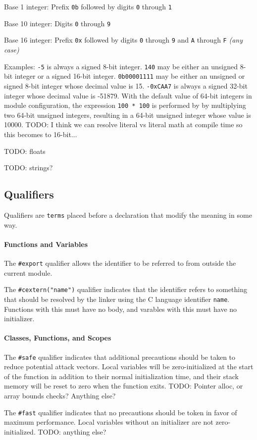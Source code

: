 \documentclass{article}
\newcommand{\code}[1]{\colorbox{light-gray}{\texttt{#1}}}
\newcommand{\breakingparagraph}[1]{\paragraph{#1}\mbox{}\medbreak}
\begin{document}
Base 1 integer: Prefix \code{0b} followed by digits \code{0} through \code{1}

Base 10 integer: Digits \code{0} through \code{9}

Base 16 integer: Prefix \code{0x} followed by digits \code{0} through \code{9} and \code{A} through \code {F} \textit{(any case)}

Examples: \code{-5} is always a signed 8-bit integer.  \code{140} may be either an unsigned 8-bit integer or a signed 16-bit integer.  \code{0b00001111} may be either an unsigned or signed 8-bit integer whose decimal value is 15.  \code{-0xCAA7} is always a signed 32-bit integer whose decimal value is -51879.  With the default value of 64-bit integers in module configuration, the expression \code{100 * 100} is performed by by multiplying two 64-bit unsigned integers, resulting in a 64-bit unsigned integer whose value is 10000.  TODO: I think we can resolve literal vs literal math at compile time so this becomes to 16-bit...

TODO: floats

TODO: strings?

\subsection{Qualifiers}

Qualifiers are \code{terms} placed before a declaration that modify the meaning in some way.

\breakingparagraph{Functions and Variables}

The \code{\#export} qualifier allows the identifier to be referred to from outside the current module.

The \code{\#cextern("name")} qualifier indicates that the identifier refers to something that should be resolved by the linker using the C language identifier \code{name}.  Functions with this must have no body, and varables with this must have no initializer.

\breakingparagraph{Classes, Functions, and Scopes}

The \code{\#safe} qualifier indicates that additional precautions should be taken to reduce potential attack vectors.  Local variables will be zero-initialized at the start of the function in addition to their normal initialization time, and their stack memory will be reset to zero when the function exits.  TODO: Pointer alloc, or array bounds checks? Anything else?

The \code{\#fast} qualifier indicates that no precautions should be token in favor of maximum performance.  Local variables without an initializer are not zero-initialized.  TODO: anything else?
\end{document}
